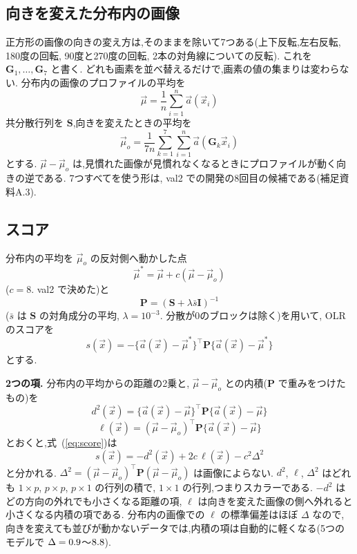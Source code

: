 \documentclass[MIRU,submit]{miru2025j}
\newcommand{\Ours}{OLR}   %
\newcommand{\Pm}{\mathbf{P}}\newcommand{\Gm}{\mathbf{G}}\newcommand{\vd}{\vec{\delta}}\newcommand{\vmu}{\vec{\mu}}\newcommand{\va}{\vec{a}}\newcommand{\Sm}{\mathbf{S}}\newcommand{\Id}{\mathbf{I}}
\renewcommand{\eqref}[1]{(\ref{#1})}   %
\begin{document}
\subsection{向きを変えた分布内の画像}
\label{sec:orient}
正方形の画像の向きの変え方は,そのままを除いて7つある(上下反転,左右反転, 180度の回転, 90度と270度の回転, 2本の対角線についての反転). これを $\Gm_1,\dots,\Gm_7$ と書く. どれも画素を並べ替えるだけで,画素の値の集まりは変わらない. 分布内の画像のプロファイルの平均を
\begin{equation}
\vmu=\frac{1}{n}\sum_{i=1}^{n}\va(\vec{x}_i)
\label{eq:mu}
\end{equation}
共分散行列を $\Sm$,向きを変えたときの平均を
\begin{equation}
\vmu_{o}=\frac{1}{7n}\sum_{k=1}^{7}\sum_{i=1}^{n}\va(\Gm_k\vec{x}_i)
\label{eq:muo}
\end{equation}
とする. $\vmu-\vmu_{o}$ は,見慣れた画像が見慣れなくなるときにプロファイルが動く向きの逆である. 7つすべてを使う形は, val2 での開発の8回目の候補である(補足資料A.3).

\subsection{スコア}
\label{sec:score}
分布内の平均を $\vmu_{o}$ の反対側へ動かした点
\begin{equation}
\vmu^{*}=\vmu+c(\vmu-\vmu_{o})
\label{eq:mustar}
\end{equation}
($c=8$. val2 で決めた)と
\begin{equation}
\Pm=(\Sm+\lambda\bar{s}\Id)^{-1}
\label{eq:prec}
\end{equation}
($\bar{s}$ は $\Sm$ の対角成分の平均, $\lambda=10^{-3}$. 分散が0のブロックは除く)を用いて, \Ours{}のスコアを
\begin{equation}
s(\vec{x})=-\{\va(\vec{x})-\vmu^{*}\}^{\top}\Pm\{\va(\vec{x})-\vmu^{*}\}
\label{eq:score}
\end{equation}
とする.

\textbf{2つの項.} 分布内の平均からの距離の2乗と, $\vmu-\vmu_{o}$ との内積($\Pm$ で重みをつけたもの)を
\begin{equation}
d^{2}(\vec{x})=\{\va(\vec{x})-\vmu\}^{\top}\Pm\{\va(\vec{x})-\vmu\}
\label{eq:dsq}
\end{equation}
\begin{equation}
\ell(\vec{x})=(\vmu-\vmu_{o})^{\top}\Pm\{\va(\vec{x})-\vmu\}
\label{eq:ell}
\end{equation}
とおくと,式~\eqref{eq:score}は
\begin{equation}
s(\vec{x})=-d^{2}(\vec{x})+2c\,\ell(\vec{x})-c^{2}\Delta^{2}
\label{eq:expand}
\end{equation}
と分かれる. $\Delta^{2}=(\vmu-\vmu_{o})^{\top}\Pm(\vmu-\vmu_{o})$ は画像によらない. $d^{2}$, $\ell$, $\Delta^{2}$ はどれも $1\times p$, $p\times p$, $p\times 1$ の行列の積で, $1\times 1$ の行列,つまりスカラーである. $-d^{2}$ はどの方向の外れでも小さくなる距離の項, $\ell$ は向きを変えた画像の側へ外れると小さくなる内積の項である. 分布内の画像での $\ell$ の標準偏差はほぼ $\Delta$ なので,向きを変えても並びが動かないデータでは,内積の項は自動的に軽くなる(5つのモデルで $\Delta=0.9$〜$8.8$).
\end{document}
